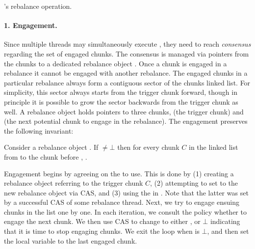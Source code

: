 \begin{algorithm*}[th]
\begin{multicols}{2}
\begin{algorithmic}[1]{}
		\end{algorithmic}
	\end{multicols}
\caption{\kiwi's rebalance operation.}
\label{alg:rebalance}
\end{algorithm*}	

\paragraph{1. Engagement.}



Since multiple threads may simultaneously execute , they need to reach \emph{consensus} regarding
the set of engaged chunks. The consensus is managed via pointers from the chunks to a dedicated rebalance object .
Once a chunk is engaged in a rebalance it cannot be engaged with another rebalance.
The engaged chunks in a particular rebalance always form a contiguous sector of the chunks linked list.
For simplicity, this sector always starts from the trigger chunk forward,  though in principle it is possible
to grow the sector backwards from the trigger chunk as well.
A rebalance object holds pointers to three chunks,  (the trigger chunk) and  
(the next potential chunk to engage in the rebalance).
The engagement  preserves the following invariant:
\begin{invariant}
Consider a rebalance object .
If ${\not=}{\bot}$ then
for every chunk $C$ in the linked list from  to the chunk before , .
\end{invariant}


Engagement
begins by agreeing on the  to use. This is done by (1) creating a rebalance object
 referring to the trigger chunk $C$, (2) attempting to set 
to the new rebalance object via CAS, and (3) using the  in .
Note that the latter was set by a successful CAS of some rebalance thread.
Next, we try to engage ensuing chunks in the list one by one.
In each iteration, we consult the policy whether to engage the next chunk.
We then use CAS to change  to either , or $\bot$ indicating
that it is time to stop engaging chunks.
We exit the loop when  is $\bot$, and then set the local variable  
to  the last engaged chunk.


